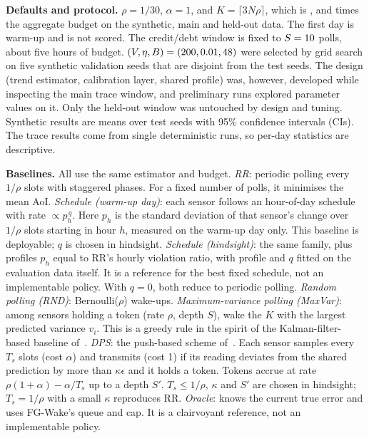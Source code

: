 \documentclass[conference]{IEEEtran}
\begin{document}
\textbf{Defaults and protocol.} $\rho=1/30$, $\alpha=1$, and $K=\lceil3N\rho\rceil$,
which is \SyHead, \TrHead{} and \HoHead{} times the aggregate budget on the
synthetic, main and held-out data. The first day is warm-up and is not scored.
The credit/debt window is fixed to $S=10$ polls, about five hours of budget.
$(V,\eta,B)=(200,0.01,48)$ were selected by grid search on five synthetic
validation seeds that are disjoint from the test seeds. The design (trend
estimator, calibration layer, shared profile) was, however, developed while
inspecting the main trace window, and preliminary runs explored parameter values
on it. Only the held-out window was untouched by design and tuning. Synthetic
results are means over \SyNseeds{} test seeds with 95\% confidence intervals
(CIs). The trace results come from single deterministic runs, so per-day
statistics are descriptive.

\textbf{Baselines.} All use the same estimator and budget.
\emph{RR}: periodic polling every $1/\rho$ slots with staggered phases. For a fixed
number of polls, it minimises the mean AoI.
\emph{Schedule (warm-up day)}: each sensor follows an hour-of-day schedule with rate
$\propto p_h^{\,q}$. Here $p_h$ is the standard deviation of that sensor's change
over $1/\rho$ slots starting in hour $h$, measured on the warm-up day only. This
baseline is deployable; $q$ is chosen in hindsight.
\emph{Schedule (hindsight)}: the same family, plus profiles $p_h$ equal to RR's
hourly violation ratio, with profile and $q$ fitted on the evaluation data
itself. It is a reference for the best fixed schedule, not an implementable
policy. With $q=0$, both reduce to periodic polling.
\emph{Random polling (RND)}: Bernoulli($\rho$) wake-ups.
\emph{Maximum-variance polling (MaxVar)}: among sensors holding a token (rate $\rho$, depth $S$), wake the
$K$ with the largest predicted variance $v_i$. This is a greedy rule in the
spirit of the Kalman-filter-based baseline of~\cite{jonah2026fair}.
\emph{DPS}: the push-based scheme of~\cite{santini2006}. Each sensor samples
every $T_s$ slots (cost $\alpha$) and transmits (cost 1) if its reading deviates
from the shared prediction by more than $\kappa\epsilon$ and it holds a token.
Tokens accrue at rate $\rho(1+\alpha)-\alpha/T_s$ up to a depth $S'$. $T_s\le1/\rho$,
$\kappa$ and $S'$ are chosen in hindsight; $T_s=1/\rho$ with a small $\kappa$
reproduces RR.
\emph{Oracle}: knows the current true error and uses FG-Wake's queue and cap. It is
a clairvoyant reference, not an implementable policy.
\end{document}

